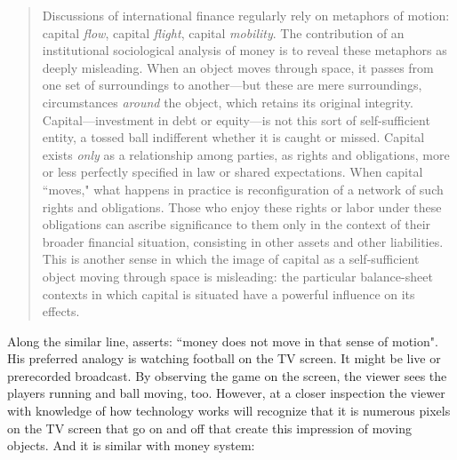 \begin{quote}
Discussions of international finance regularly rely on metaphors of motion: capital \textit{flow}, capital \textit{flight}, capital \textit{mobility}. The contribution of an institutional sociological analysis of money is to reveal these metaphors as deeply misleading. When an object moves through space, it passes from one set of surroundings to another---but these are mere surroundings, circumstances \textit{around} the object, which retains its original integrity. Capital---investment in debt or equity---is not this sort of self-sufficient entity, a tossed ball indifferent whether it is caught or missed. Capital exists \textit{only} as a relationship among parties, as rights and obligations, more or less perfectly specified in law or shared expectations. When capital ``moves," what happens in practice is reconfiguration of a network of such rights and obligations. Those who enjoy these rights or labor under these obligations can ascribe significance to them only in the context of their broader financial situation, consisting in other assets and other liabilities. This is another sense in which the image of capital as a self-sufficient object moving through space is misleading: the particular balance-sheet contexts in which capital is situated have a powerful influence on its effects. \citep[p.~36, emphasis original]{woodruff2005}
\end{quote}

Along the similar line, \cite{mosler2022,mosler2023} asserts: ``money does not move in that sense of motion". His preferred analogy is watching football on the TV screen. It might be live or prerecorded broadcast. By observing the game on the screen, the viewer sees the players running and ball moving, too. However, at a closer inspection the viewer with knowledge of how technology works will recognize that it is numerous pixels on the TV screen that go on and off that create this impression of moving objects. And it is similar with money system:

